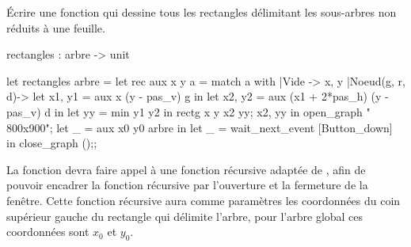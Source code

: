 \begin{minipage}{0.5\textwidth}
\begin{question}{}{}
Écrire une fonction  qui dessine tous les rectangles délimitant les sous-arbres non réduits à une feuille.
\begin{ocaml}
rectangles : arbre -> unit
\end{ocaml}

\reponse

\begin{ocaml}
let rectangles arbre =
    let rec aux x y a =
        match a with
        |Vide -> x, y
        |Noeud(g, r, d)-> 
                let x1, y1 = aux x (y - pas_v) g in
                let x2, y2 = aux (x1 + 2*pas_h) 
                                 (y - pas_v) d in
                let yy = min y1 y2 in
                rectg x y x2 yy;
                x2, yy in
    open_graph " 800x900";
    let _ = aux x0 y0 arbre in
    let _ = wait_next_event [Button_down] in close_graph ();;
\end{ocaml}

\newpage
\end{question}
La fonction devra faire appel à une fonction récursive adaptée de , afin de pouvoir encadrer la fonction récursive par l'ouverture et la fermeture de la fenêtre. Cette fonction récursive aura comme paramètres les coordonnées du coin supérieur gauche du rectangle qui délimite l'arbre, pour l'arbre global ces coordonnées sont $x_0$ et $y_0$.
\end{minipage}
\begin{minipage}{0.5\textwidth}
\begin{center}
\end{center}
\end{minipage}
\newpage
